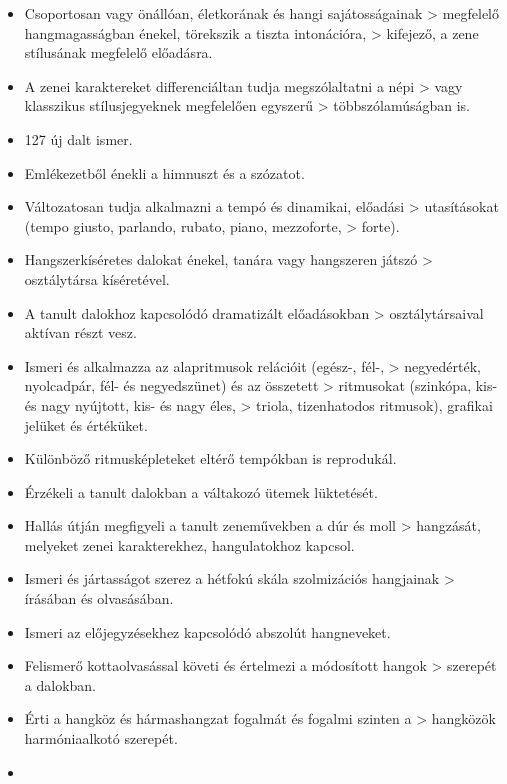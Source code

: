 \begin{itemize}
\item
  Csoportosan vagy önállóan, életkorának és hangi sajátosságainak
  \textgreater{} megfelelő hangmagasságban énekel, törekszik a tiszta
  intonációra, \textgreater{} kifejező, a zene stílusának megfelelő
  előadásra.
\item
  A zenei karaktereket differenciáltan tudja megszólaltatni a népi
  \textgreater{} vagy klasszikus stílusjegyeknek megfelelően egyszerű
  \textgreater{} többszólamúságban is.
\item
  127 új dalt ismer.
\item
  Emlékezetből énekli a himnuszt és a szózatot.
\item
  Változatosan tudja alkalmazni a tempó és dinamikai, előadási
  \textgreater{} utasításokat (tempo giusto, parlando, rubato, piano,
  mezzoforte, \textgreater{} forte).
\item
  Hangszerkíséretes dalokat énekel, tanára vagy hangszeren játszó
  \textgreater{} osztálytársa kíséretével.
\item
  A tanult dalokhoz kapcsolódó dramatizált előadásokban \textgreater{}
  osztálytársaival aktívan részt vesz.
\item
  Ismeri és alkalmazza az alapritmusok relációit (egész-, fél-,
  \textgreater{} negyedérték, nyolcadpár, fél- és negyedszünet) és az
  összetett \textgreater{} ritmusokat (szinkópa, kis- és nagy nyújtott,
  kis- és nagy éles, \textgreater{} triola, tizenhatodos ritmusok),
  grafikai jelüket és értéküket.
\item
  Különböző ritmusképleteket eltérő tempókban is reprodukál.
\item
  Érzékeli a tanult dalokban a váltakozó ütemek lüktetését.
\item
  Hallás útján megfigyeli a tanult zeneművekben a dúr és moll
  \textgreater{} hangzását, melyeket zenei karakterekhez, hangulatokhoz
  kapcsol.
\item
  Ismeri és jártasságot szerez a hétfokú skála szolmizációs hangjainak
  \textgreater{} írásában és olvasásában.
\item
  Ismeri az előjegyzésekhez kapcsolódó abszolút hangneveket.
\item
  Felismerő kottaolvasással követi és értelmezi a módosított hangok
  \textgreater{} szerepét a dalokban.
\item
  Érti a hangköz és hármashangzat fogalmát és fogalmi szinten a
  \textgreater{} hangközök harmóniaalkotó szerepét.
\item

\end{itemize}
